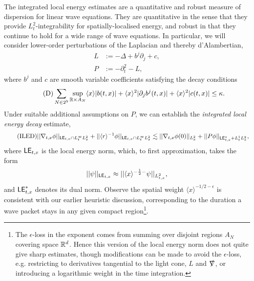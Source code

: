 The integrated local energy estimates are a quantitative and robust measure of dispersion for linear wave equations. They are quantitative in the sense that they provide $L^2_t$-integrability for spatially-localised energy, and robust in that they continue to hold for a wide range of wave equations. In particular, we will consider lower-order perturbations of the Laplacian and thereby d'Alambertian, 
	\begin{align*}
		L
			&:= - \Delta + b^j \partial_j + c, \\
		P
			&:= - \partial_t^2 - L,
	\end{align*}
where $b^j$ and $c$ are smooth variable coefficients satisfying the decay conditions 
	\begin{equation}\label{eq:decay}\tag{D}
		\sum_{N \in 2^\mathbb N} \sup_{\mathbb R \times A_N} \langle x \rangle |b(t, x)| + \langle x \rangle^2 |\partial_j b^j (t,x)| + \langle x \rangle^2 |c(t, x)| \leq \kappa.
	\end{equation}
Under suitable additional assumptions on $P$,  we can establish the \textit{integrated local energy decay} estimate,
	\begin{equation}\tag{$\mathrm{ILED}$}\label{eq:iled}
		||\nabla_{t, x} \phi||_{\LE_{t,x} \cap L^\infty_t L^2_x} + ||\langle r \rangle^{-1} \phi||_{\LE_{t, x}\cap L^\infty_t L^2_x} \lesssim ||\nabla_{t, x} \phi (0)||_{L^2_x} + ||P \phi ||_{\LE^*_{t, x} + L^1_t L^2_x},
	\end{equation}
where $\mathsf{LE}_{t, x}$ is the local energy norm, which, to first approximation, takes the form 
	\[
		||\psi||_{\mathsf{LE}_{t, x}} \approx ||\langle x \rangle^{-\frac12 -} \psi ||_{L^2_{t, x}},
	\]	
and $\mathsf{LE}_{t, x}^*$ denotes its dual norm. Observe the spatial weight $\langle x \rangle^{-1/2 - \epsilon}$ is consistent with our earlier heuristic discussion, corresponding to the duration a wave packet stays in any given compact region\footnote{The $\epsilon$-loss in the exponent comes from summing over disjoint regions $A_N$ covering space $\mathbb R^d$. Hence this version of the local energy norm does not quite give sharp estimates, though modifications can be made to avoid the $\epsilon$-loss, e.g. restricting to derivatives tangential to the light cone, $L$ and $\slashed \nabla$, or introducing a logarithmic weight in the time integration.}. 
